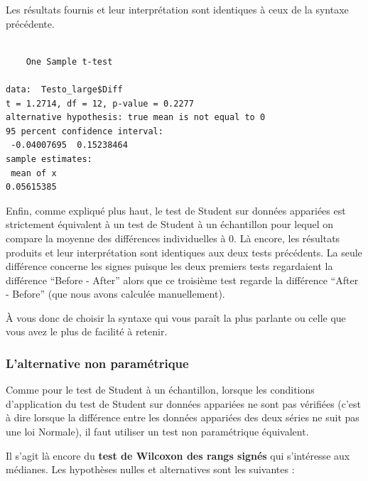 \documentclass[
  a4paper,
]{article}
\newenvironment{Shaded}{\begin{snugshade}}{\end{snugshade}}
\newcommand{\CommentTok}[1]{\textcolor[rgb]{0.54,0.53,0.53}{#1}}
\newcommand{\DataTypeTok}[1]{\textcolor[rgb]{0.00,0.34,0.68}{#1}}
\newcommand{\DecValTok}[1]{\textcolor[rgb]{0.69,0.50,0.00}{#1}}
\newcommand{\KeywordTok}[1]{\textcolor[rgb]{0.12,0.11,0.11}{\textbf{#1}}}
\newcommand{\NormalTok}[1]{\textcolor[rgb]{0.12,0.11,0.11}{#1}}
\newcommand{\OperatorTok}[1]{\textcolor[rgb]{0.12,0.11,0.11}{#1}}
\begin{document}
Les résultats fournis et leur interprétation sont identiques à ceux de la syntaxe précédente.

\begin{Shaded}
\end{Shaded}

\begin{verbatim}

    One Sample t-test

data:  Testo_large$Diff
t = 1.2714, df = 12, p-value = 0.2277
alternative hypothesis: true mean is not equal to 0
95 percent confidence interval:
 -0.04007695  0.15238464
sample estimates:
 mean of x 
0.05615385 
\end{verbatim}

Enfin, comme expliqué plus haut, le test de Student sur données appariées est strictement équivalent à un test de Student à un échantillon pour lequel on compare la moyenne des différences individuelles à 0. Là encore, les résultats produits et leur interprétation sont identiques aux deux tests précédents. La seule différence concerne les signes puisque les deux premiers tests regardaient la différence ``Before - After'' alors que ce troisième test regarde la différence ``After - Before'' (que nous avons calculée manuellement).

À vous donc de choisir la syntaxe qui vous paraît la plus parlante ou celle que vous avez le plus de facilité à retenir.

\hypertarget{lalternative-non-paramuxe9trique-1}{%
\subsubsection{L'alternative non paramétrique}\label{lalternative-non-paramuxe9trique-1}}

Comme pour le test de Student à un échantillon, lorsque les conditions d'application du test de Student sur données appariées ne sont pas vérifiées (c'est à dire lorsque la différence entre les données appariées des deux séries ne suit pas une loi Normale), il faut utiliser un test non paramétrique équivalent.

Il s'agit là encore du \textbf{test de Wilcoxon des rangs signés} qui s'intéresse aux médianes. Les hypothèses nulles et alternatives sont les suivantes :
\end{document}
